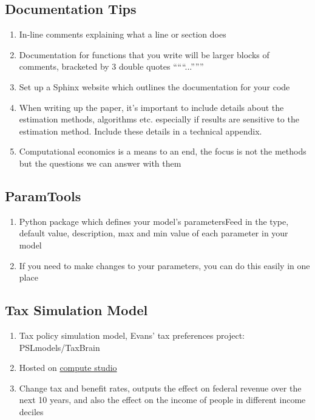 \documentclass{article}
\begin{document}
\subsection{Documentation Tips}
\begin{enumerate}
	\item In-line comments explaining what a line or section does
	\item Documentation for functions that you write will be larger blocks of comments, bracketed by 3 double quotes ``````...''''''
	\item Set up a Sphinx website which outlines the documentation for your code
	\item When writing up the paper, it’s important to include details about the estimation methods, algorithms etc. especially if results are sensitive to the estimation method. Include these details in a technical appendix. 
	\item Computational economics is a means to an end, the focus is not the methods but the questions we can answer with them
\end{enumerate}

\subsection{ParamTools}
\begin{enumerate}
	\item Python package which defines your model’s parametersFeed in the type, default value, description, max and min value of each parameter in your model
	\item If you need to make changes to your parameters, you can do this easily in one place
\end{enumerate}

\subsection{Tax Simulation Model}
\begin{enumerate}

	\item Tax policy simulation model, Evans' tax preferences project: PSLmodels/TaxBrain
	\item Hosted on \href{https://compute.studio/PSLmodels/Tax-Brain/}{compute studio}
	\item Change tax and benefit rates, outputs the effect on federal revenue over the next 10 years, and also the effect on the income of people in different income deciles
\end{enumerate}
\end{document}
